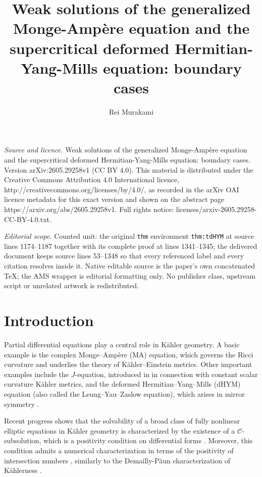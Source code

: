 \documentclass[10pt,a4paper]{amsart}
\numberwithin{equation}{section}
\begin{document}
\title[Weak solutions of the generalized Monge-Amp`ere equation and]{Weak solutions of the generalized Monge-Amp\`ere equation and the supercritical deformed Hermitian-Yang-Mills equation: boundary cases}
\author{Rei Murakami}
\date{}
\maketitle
\noindent\emph{Source and licence.} Weak solutions of the generalized Monge-Amp\`ere equation and the supercritical deformed Hermitian-Yang-Mills equation: boundary cases. Version arXiv:2605.29258v1 (CC BY 4.0). This material is distributed under the Creative Commons Attribution 4.0 International licence, http://creativecommons.org/licenses/by/4.0/, as recorded in the arXiv OAI licence metadata for this exact version and shown on the abstract page https://arxiv.org/abs/2605.29258v1. Full rights notice: licenses/arxiv-2605.29258-CC-BY-4.0.txt.\par\smallskip
\noindent\textit{Editorial scope.} Counted unit: the original \texttt{thm} environment \texttt{thm:tdHYM} at source lines 1174--1187 together with its complete proof at lines 1341--1345; the delivered document keeps source lines 53--1348 so that every referenced label and every citation resolves inside it. Native editable source is the paper's own concatenated TeX; the AMS wrapper is editorial formatting only. No publisher class, upstream script or unrelated artwork is redistributed.
\section{Introduction}\label{sec:intro}
Partial differential equations play a central role in Kähler geometry. 
A basic example is the complex Monge–Ampère (MA) equation, which governs the Ricci curvature and underlies the theory of Kähler–Einstein metrics. Other important examples include the $J$-equation, introduced in \cite{Don,XChen} in connection with constant scalar curvature Kähler metrics, and the deformed Hermitian–Yang–Mills (dHYM) equation (also called the Leung–Yau–Zaslow equation), which arises in mirror symmetry \cite{LYZ}.

Recent progress shows that the solvability of a broad class of fully nonlinear elliptic equations in Kähler geometry is characterized by the existence of a $\mathcal{C}$-subsolution, which is a positivity condition on differential forms \cite{SW,FLM,DK,Sun,Sze,GS,CJY,Pin,Lina,Linb,FYZ2}. 
Moreover, this condition admits a numerical characterization in terms of the positivity of intersection numbers \cite{GChen,Song,Datar-Pingali,CLT,FM}, similarly to the Demailly-Păun characterization of Kählerness \cite{DP}. 
\end{document}
